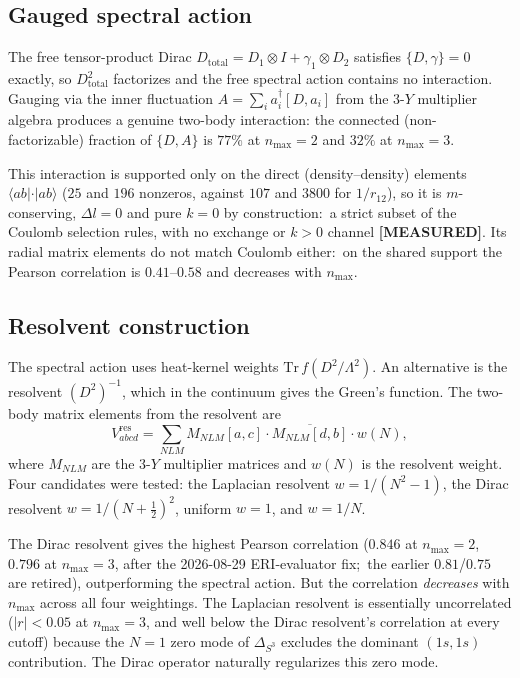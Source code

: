 \documentclass[twocolumn,pra,amsmath,amssymb,superscriptaddress]{revtex4-2}
\begin{document}
\subsection{Gauged spectral action}

The free tensor-product Dirac
$D_{\mathrm{total}} = D_1 \otimes I + \gamma_1 \otimes D_2$
satisfies $\{D, \gamma\} = 0$ exactly, so $D_{\mathrm{total}}^2$
factorizes and the free spectral action contains no interaction.
Gauging via the inner fluctuation
$A = \sum_i a_i^\dagger [D, a_i]$ from the 3-$Y$ multiplier algebra
produces a genuine two-body interaction: the connected
(non-factorizable) fraction of $\{D, A\}$ is $77\%$ at
$n_{\max} = 2$ and $32\%$ at $n_{\max} = 3$.

This interaction is supported only on the direct (density--density)
elements $\langle ab|\cdot|ab\rangle$ ($25$ and $196$ nonzeros, against
$107$ and $3800$ for $1/r_{12}$), so it is $m$-conserving, $\Delta l =
0$ and pure $k = 0$ by construction:\ a strict subset of the Coulomb
selection rules, with no exchange or $k > 0$ channel
\textbf{[MEASURED]}.  Its radial matrix elements do not match Coulomb
either:\ on the shared support the Pearson correlation is
$0.41$--$0.58$ and decreases with $n_{\max}$.

\subsection{Resolvent construction}

The spectral action uses heat-kernel weights
$\mathrm{Tr}\,f(D^2/\Lambda^2)$.  An alternative is the resolvent
$(D^2)^{-1}$, which in the continuum gives the Green's function.
The two-body matrix elements from the resolvent are
\begin{equation}
  V^{\mathrm{res}}_{abcd} = \sum_{NLM}
  M_{NLM}[a,c] \cdot \overline{M_{NLM}[d,b]} \cdot w(N),
  \label{eq:resolvent_interaction}
\end{equation}
where $M_{NLM}$ are the 3-$Y$ multiplier matrices and $w(N)$ is the
resolvent weight.  Four candidates were tested: the Laplacian
resolvent $w = 1/(N^2-1)$, the Dirac resolvent $w = 1/(N+\frac{1}{2})^2$,
uniform $w = 1$, and $w = 1/N$.

The Dirac resolvent gives the highest Pearson correlation ($0.846$ at
$n_{\max} = 2$, $0.796$ at $n_{\max} = 3$, after the 2026-08-29
ERI-evaluator fix;\ the earlier $0.81$/$0.75$ are retired), outperforming the
spectral action.  But the correlation \emph{decreases} with
$n_{\max}$ across all four weightings.  The Laplacian resolvent is
essentially uncorrelated ($|r| < 0.05$ at $n_{\max}=3$, and well below
the Dirac resolvent's correlation at every cutoff) because the $N = 1$
zero mode of $\Delta_{S^3}$ excludes the dominant $(1s,1s)$ contribution.
The Dirac operator naturally regularizes this zero mode.
\end{document}

